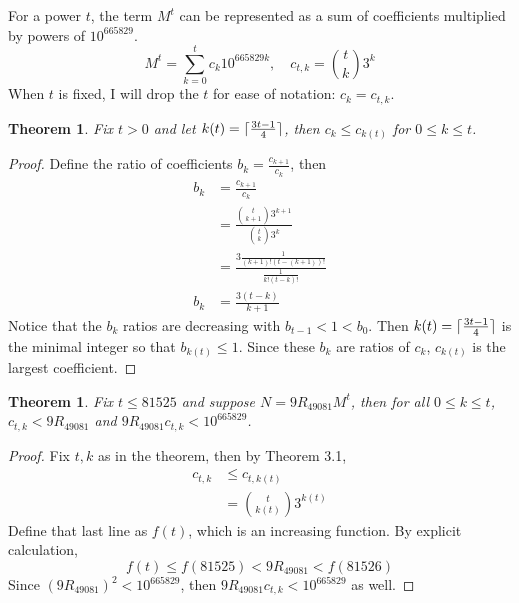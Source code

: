 \documentclass{amsart}
\newcommand{\RE}{{49081}}
\newcommand{\ME}{{665829}}
\DeclarePairedDelimiter\ceil{\lceil}{\rceil}
\numberwithin{equation}{section}
\theoremstyle{plain} %
\newtheorem{thm}[equation]{Theorem}
\theoremstyle{definition}
\theoremstyle{remark}
\begin{document}
 For a power $t$, the term $M^t$ can be represented as a sum of coefficients multiplied by powers of $10^\ME$.
$$M^t = \sum_{k = 0}^t c_k  10^{\ME k}, \quad c_{t,k} = \binom{t}{k} 3^k $$
When $t$ is fixed, I will drop the $t$ for ease of notation: $c_{k} = c_{t,k}$.
\begin{thm} Fix $t> 0$ and let $k(t) =  \ceil{\frac{3t-1}{4}}$, then $ c_{k} \leq c_{k(t)}$ for $0 \leq k \leq t$.
\end{thm}
\begin{proof}
Define the ratio of coefficients $b_k = \frac{c_{k+1}}{c_k}$, then 
\begin{align*}
b_k &=  \frac{c_{k+1}}{c_k}\\
&= \frac{ \binom{t}{k+1} 3^{k+1}}{ \binom{t}{k} 3^k}\\
&=  \frac{3  \frac{1}{(k+1)! (t - (k+1))!}}{\frac{1}{k! (t - k)!}}\\
b_k &= \frac{ 3(t-k)}{k + 1}
\end{align*}
Notice that the $b_k$ ratios are decreasing with $b_{t-1} < 1 < b_0$. Then $k(t) = \ceil{\frac{3t-1}{4}}$ is the minimal integer so that $b_{k(t)} \leq  1$. Since these $b_k$ are ratios of $c_k$, $c_{k(t)}$ is the largest coefficient. 
\end{proof}
\begin{thm} Fix $t \leq 81525$ and suppose $N = 9 R_{49081} M^t$, then for all $0 \leq k \leq t$,  $c_{t,k} < 9R_{\RE}$ and $9 R_{\RE} c_{t,k} < 10^\ME$.
\end{thm}
\begin{proof}
Fix $t,k$ as in the theorem, then by Theorem 3.1,
\begin{align*}
c_{t,k} & \leq c_{t,k(t)} \\
&= \binom{t}{k(t)} 3^{k(t)}
\end{align*}
Define that last line as $f(t)$, which is an increasing function. By explicit calculation,$$f(t) \leq f(81525) < 9R_\RE < f(81526) $$
Since $(9R_{\RE})^2 < 10^\ME$, then  $9 R_{\RE} c_{t,k} < 10^\ME$ as well.

\end{proof}
\end{document}
